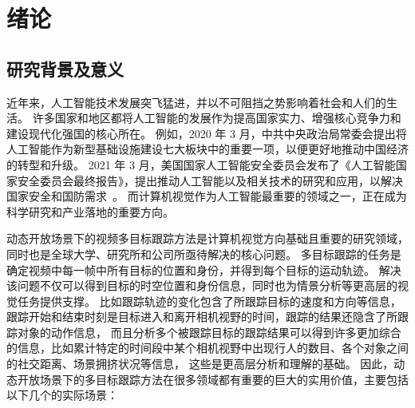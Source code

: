 
\chapter{绪论}

\section{研究背景及意义}
近年来，人工智能技术发展突飞猛进，并以不可阻挡之势影响着社会和人们的生活。
许多国家和地区都将人工智能的发展作为提高国家实力、增强核心竞争力和建设现代化强国的核心所在。
例如，2020 年 3 月，中共中央政治局常委会提出将人工智能作为新型基础设施建设七大板块中的重要一项，以便更好地推动中国经济的转型和升级。
2021 年 3 月，美国国家人工智能安全委员会发布了《人工智能国家安全委员会最终报告》，提出推动人工智能以及相关技术的研究和应用，以解决国家安全和国防需求~\cite{schmidt2021national}。
而计算机视觉作为人工智能最重要的领域之一，正在成为科学研究和产业落地的重要方向。

动态开放场景下的视频多目标跟踪方法是计算机视觉方向基础且重要的研究领域，同时也是全球大学、研究所和公司所亟待解决的核心问题。
多目标跟踪的任务是确定视频中每一帧中所有目标的位置和身份，并得到每个目标的运动轨迹。
解决该问题不仅可以得到目标的时空位置和身份信息，同时也为情景分析等更高层的视觉任务提供支撑。
比如跟踪轨迹的变化包含了所跟踪目标的速度和方向等信息，跟踪开始和结束时刻是目标进入和离开相机视野的时间，跟踪的结果还隐含了所跟踪对象的动作信息，
而且分析多个被跟踪目标的跟踪结果可以得到许多更加综合的信息，比如累计特定的时间段中某个相机视野中出现行人的数目、各个对象之间的社交距离、场景拥挤状况等信息，
这些是更高层分析和理解的基础。
因此，动态开放场景下的多目标跟踪方法在很多领域都有重要的巨大的实用价值，主要包括以下几个的实际场景：

